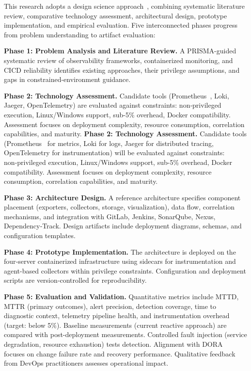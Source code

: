 \documentclass[12pt]{article}
\begin{document}
This research adopts a design science approach~\cite{hevner2004design}, combining systematic literature review, comparative technology assessment, architectural design, prototype implementation, and empirical evaluation. Five interconnected phases progress from problem understanding to artifact evaluation:

\textbf{Phase 1: Problem Analysis and Literature Review.} A \ac{PRISMA}-guided systematic review of observability frameworks, containerized monitoring, and \ac{CICD} reliability identifies existing approaches, their privilege assumptions, and gaps in constrained-environment guidance.

\textbf{Phase 2: Technology Assessment.} Candidate tools (Prometheus~\cite{prometheus2016}, Loki, Jaeger, OpenTelemetry) are evaluated against constraints: non‑privileged execution, Linux/Windows support, sub-5\% overhead, Docker compatibility. Assessment focuses on deployment complexity, resource consumption, correlation capabilities, and maturity.
\textbf{Phase 2: Technology Assessment.} Candidate tools (Prometheus~\cite{prometheus2016} for metrics, Loki for logs, Jaeger for distributed tracing, \gls{OpenTelemetry} for instrumentation) will be evaluated against constraints: non‑privileged execution, Linux/Windows support, sub-5\% overhead, Docker~\cite{docker2014} compatibility. Assessment focuses on deployment complexity, resource consumption, correlation capabilities, and maturity.

\textbf{Phase 3: Architecture Design.} A reference architecture specifies component placement (exporters, collectors, storage, visualization), data flow, correlation mechanisms, and integration with GitLab, Jenkins, SonarQube, Nexus, Dependency‑Track. Design artifacts include deployment diagrams, schemas, and configuration templates.

\textbf{Phase 4: Prototype Implementation.} The architecture is deployed on the four‑server containerized infrastructure using sidecars for instrumentation and agent-based collectors within privilege constraints. Configuration and deployment scripts are version‑controlled for reproducibility.

\textbf{Phase 5: Evaluation and Validation.} Quantitative metrics include \ac{MTTD}, \ac{MTTR} (primary outcomes), alert precision, detection coverage, time to diagnostic context, telemetry pipeline health, and instrumentation overhead (target: below 5\%). Baseline measurements (current reactive approach) are compared with post-deployment measurements. Controlled fault injection (service degradation, resource exhaustion) tests detection. Alignment with \ac{DORA}~\cite{forsgren2018accelerate,forsgren2024dora} focuses on change failure rate and recovery performance. Qualitative feedback from DevOps practitioners assesses operational impact.
\end{document}
